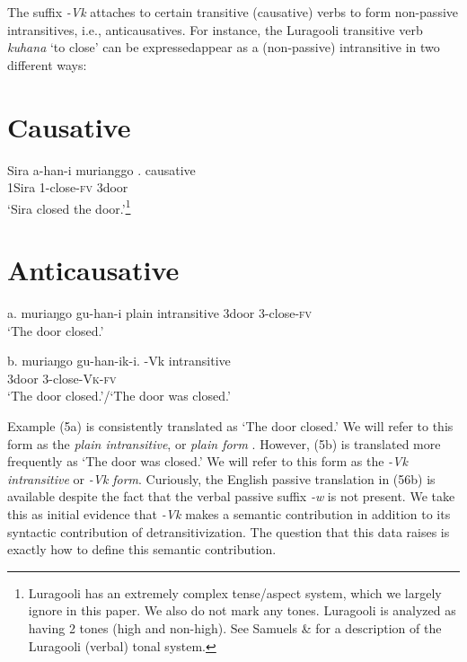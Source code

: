 \documentclass[output=paper]{langsci/langscibook}
\begin{document}
\begin{styleTabellenberschrift}
The suffix \textit{{}-}\textit{Vk} attaches to certain transitive (causative) verbs %
%
to form non-passive intransitives, i.e., anticausatives. For instance, the Luragooli transitive verb \textit{kuhana} ‘to close’ can be expressedappear as a (non-passive) intransitive in two different ways:

\chapter[  Causative]{  Causative}
\gll Sira    a-han-i      murianggo%
%
.    causative\\
     1Sira 1-close{}-\textsc{fv}  3door\\
\glt ‘Sira closed the door.’\footnote{ Luragooli has an extremely complex tense/aspect system, which we largely ignore in this paper. We also do not mark any tones. Luragooli is analyzed as having 2 tones (high and non-high). See Samuels \& \citet{Paster2015} for a description of the Luragooli (verbal) tonal system.}\textsuperscript{ }
\z

\chapter[  Anticausative]{  Anticausative}
\gll a. muriaŋgo gu{}-han{}-i        plain intransitive%
       3door       3-close-\textsc{fv}\\
\glt ‘The door closed.’
\z

\gll b. muriaŋgo gu{}-han-ik{}-i.      {}-\textup{Vk} intransitive\\
       3door         3-close-\textsc{V}\textsc{k}{}-\textsc{fv}\\
\glt ‘The door closed.’/‘The door was closed.’
\z

Example (5a) is consistently translated as ‘The door closed.’ We will refer to this form as the \textit{plain intransitive}, or \textit{plain form}%
%
.\textsuperscript{ }However, (5b) is translated more frequently as ‘The door was closed.’ We will refer to this form as the \textit{{}-}\textit{Vk}\textit{ intransitive} or \textit{{}-}\textit{Vk}\textit{ form}. Curiously, the English passive translation in (56b) is available despite the fact that the verbal passive suffix \textit{{}-w }is not present. We take this as initial evidence that \textit{{}-}\textit{Vk} makes a semantic contribution in addition to its syntactic contribution of detransitivization. The question that this data raises is exactly how to define this semantic contribution.


\end{styleTabellenberschrift}
\end{document}
